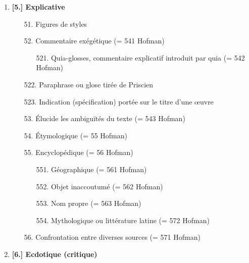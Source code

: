 \documentclass[a4paper, twoside, 12pt]{book}
\begin{document}
{\begin{enumerate}
\begin{enumerate}
\begin{enumerate}
\begin{enumerate}
        \item[4224.] Par un nom ou pronom à l'accusatif
        \item[4225.] Par un nom ou pronom au vocatif (?)
        \item[4226.] Par un adverbe
        \item[4227.] Par un adjectif
        \item[4228.] Par un verbe ou une courte proposition
        \item[4229.] Par une conjonction ou une préposition
      \end{enumerate}
      \item[423.] Modifie un adjectif (?)
      \item[424.] Structure (gloses 'adit')
    \end{enumerate}
  \end{enumerate}
  \item\textbf{[5.] Explicative}
  \begin{enumerate}
    \item[51.] Figures de styles
    \item[52.] Commentaire exégétique (= 541 Hofman)
    \begin{enumerate}
      \item[521.] \og{}Quia-glosses\fg{}, commentaire explicatif introduit par quia (= 542 Hofman)
    \end{enumerate}
    \item[522.] Paraphrase ou glose tirée de Priscien
    \item[523.] Indication (spécification) portée sur le titre d'une œuvre
    \item[53.] Élucide les ambiguïtés du texte (= 543 Hofman)
    \item[54.] Étymologique (= 55 Hofman)
    \item[55.] Encyclopédique (= 56 Hofman)
    \begin{enumerate}
      \item[551.] Géographique (= 561 Hofman)
      \item[552.] Objet inaccoutumé (= 562 Hofman)
      \item[553.] Nom propre (= 563 Hofman)
      \item[554.] Mythologique ou littérature latine (= 572 Hofman)
    \end{enumerate}
    \item[56.] Confrontation entre diverses sources (= 571 Hofman)
  \end{enumerate}
  \item\textbf{[6.] Ecdotique (critique)}

\end{enumerate}}
\end{document}
